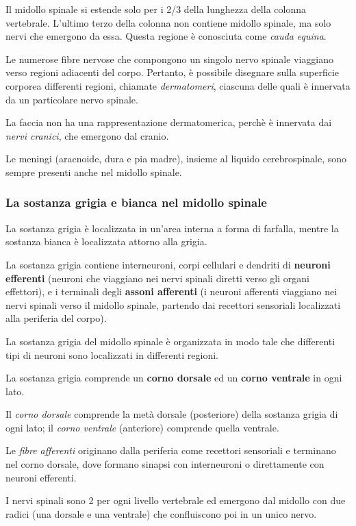 \documentclass[]{article}
\begin{document}
Il midollo spinale si estende solo per i 2/3 della lunghezza della
colonna vertebrale. L'ultimo terzo della colonna non contiene midollo
spinale, ma solo nervi che emergono da essa. Questa regione è conosciuta
come \emph{cauda equina}.

Le numerose fibre nervose che compongono un singolo nervo spinale
viaggiano verso regioni adiacenti del corpo. Pertanto, è possibile
disegnare sulla superficie corporea differenti regioni, chiamate
\emph{dermatomeri}, ciascuna delle quali è innervata da un particolare
nervo spinale.

La faccia non ha una rappresentazione dermatomerica, perchè è innervata
dai \emph{nervi cranici}, che emergono dal cranio.

Le meningi (aracnoide, dura e pia madre), insieme al liquido
cerebrospinale, sono sempre presenti anche nel midollo spinale.

\subsubsection{La sostanza grigia e bianca nel midollo
spinale}\label{la-sostanza-grigia-e-bianca-nel-midollo-spinale}

La sostanza grigia è localizzata in un'area interna a forma di farfalla,
mentre la sostanza bianca è localizzata attorno alla grigia.

La sostanza grigia contiene interneuroni, corpi cellulari e dendriti di
\textbf{neuroni efferenti} (neuroni che viaggiano nei nervi spinali
diretti verso gli organi effettori), e i terminali degli \textbf{assoni
afferenti} (i neuroni afferenti viaggiano nei nervi spinali verso il
midollo spinale, partendo dai recettori sensoriali localizzati alla
periferia del corpo).

La sostanza grigia del midollo spinale è organizzata in modo tale che
differenti tipi di neuroni sono localizzati in differenti regioni.

La sostanza grigia comprende un \textbf{corno dorsale} ed un
\textbf{corno ventrale} in ogni lato.

Il \emph{corno dorsale} comprende la metà dorsale (posteriore) della
sostanza grigia di ogni lato; il \emph{corno ventrale} (anteriore)
comprende quella ventrale.

Le \emph{fibre afferenti} originano dalla periferia come recettori
sensoriali e terminano nel corno dorsale, dove formano sinapsi con
interneuroni o direttamente con neuroni efferenti.

I nervi spinali sono 2 per ogni livello vertebrale ed emergono dal
midollo con due radici (una dorsale e una ventrale) che confluiscono poi
in un unico nervo.
\end{document}
